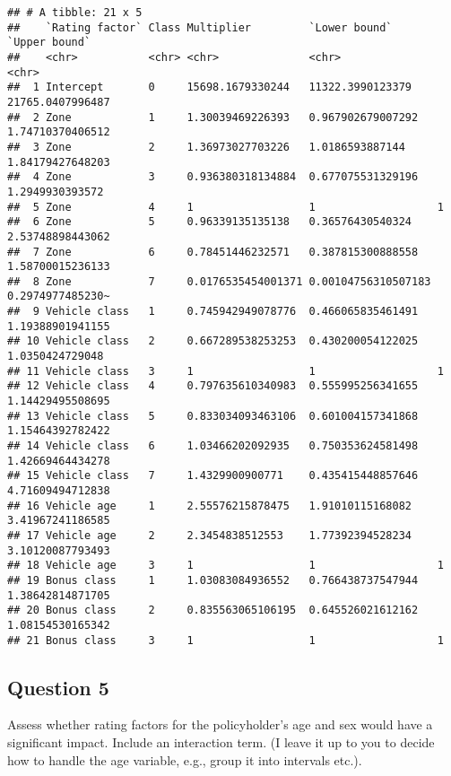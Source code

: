 \documentclass[
]{article}
\begin{document}
\begin{verbatim}
## # A tibble: 21 x 5
##    `Rating factor` Class Multiplier         `Lower bound`       `Upper bound`   
##    <chr>           <chr> <chr>              <chr>               <chr>           
##  1 Intercept       0     15698.1679330244   11322.3990123379    21765.0407996487
##  2 Zone            1     1.30039469226393   0.967902679007292   1.74710370406512
##  3 Zone            2     1.36973027703226   1.0186593887144     1.84179427648203
##  4 Zone            3     0.936380318134884  0.677075531329196   1.2949930393572 
##  5 Zone            4     1                  1                   1               
##  6 Zone            5     0.96339135135138   0.36576430540324    2.53748898443062
##  7 Zone            6     0.78451446232571   0.387815300888558   1.58700015236133
##  8 Zone            7     0.0176535454001371 0.00104756310507183 0.2974977485230~
##  9 Vehicle class   1     0.745942949078776  0.466065835461491   1.19388901941155
## 10 Vehicle class   2     0.667289538253253  0.430200054122025   1.0350424729048 
## 11 Vehicle class   3     1                  1                   1               
## 12 Vehicle class   4     0.797635610340983  0.555995256341655   1.14429495508695
## 13 Vehicle class   5     0.833034093463106  0.601004157341868   1.15464392782422
## 14 Vehicle class   6     1.03466202092935   0.750353624581498   1.42669464434278
## 15 Vehicle class   7     1.4329900900771    0.435415448857646   4.71609494712838
## 16 Vehicle age     1     2.55576215878475   1.91010115168082    3.41967241186585
## 17 Vehicle age     2     2.3454838512553    1.77392394528234    3.10120087793493
## 18 Vehicle age     3     1                  1                   1               
## 19 Bonus class     1     1.03083084936552   0.766438737547944   1.38642814871705
## 20 Bonus class     2     0.835563065106195  0.645526021612162   1.08154530165342
## 21 Bonus class     3     1                  1                   1
\end{verbatim}

\hypertarget{question-5}{%
\subsection{Question 5}\label{question-5}}

Assess whether rating factors for the policyholder's age and sex would
have a significant impact. Include an interaction term. (I leave it up
to you to decide how to handle the age variable, e.g., group it into
intervals etc.).
\end{document}
